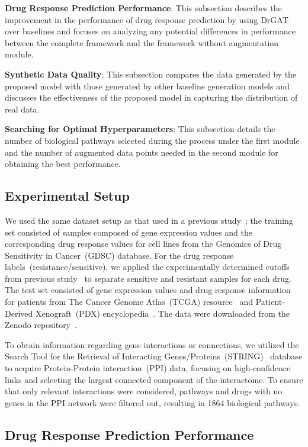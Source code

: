 \documentclass[runningheads]{llncs}
\newcommand{\drdiff}{DrGAT\xspace}
\begin{document}
\textbf{Drug Response Prediction Performance}: This subsection
describes the improvement in the performance of drug response
prediction by using \drdiff over baselines and focuses on analyzing any potential differences in performance between the complete framework and the framework without augmentation module.

\textbf{Synthetic Data Quality}: This subsection compares the data generated by the proposed model with those generated by other baseline generation models and discusses the effectiveness of the proposed model in capturing the distribution of real data.

\textbf{Searching for Optimal Hyperparameters}: This subsection
details the number of biological pathways selected during the process
under the first module and the number of augmented data points needed
in the second module for obtaining the best performance. 

\subsection{Experimental Setup}\label{sec:setup}

We used the same dataset setup as that used in a previous study~\cite{29}; the training set consisted of samples composed of gene expression values and the corresponding drug response values for cell lines from the Genomics of Drug Sensitivity in Cancer~(GDSC)
database. For the drug response labels~(resistance/sensitive), we
applied the experimentally determined cutoffs from previous
study~\cite{18} to separate sensitive and resistant samples for each drug. The
test set consisted of gene expression values and drug response
information for patients from The Cancer Genome Atlas~(TCGA)
resource~\cite{8} and Patient-Derived Xenograft~(PDX) encyclopedia~\cite{10}. The data were downloaded from the Zenodo repository~\cite{29}.

To obtain information regarding gene interactions or connections, we utilized the Search Tool for the Retrieval of Interacting Genes/Proteins~(STRING)~\cite{34} database to acquire Protein-Protein interaction~(PPI) data, focusing on high-confidence links and selecting the largest connected component of the interactome. To ensure that only relevant interactions were considered, pathways and drugs with no genes in the PPI network were filtered out, resulting in 1864 biological pathways.

\subsection{Drug Response Prediction Performance}\label{sec:drug}
\end{document}
